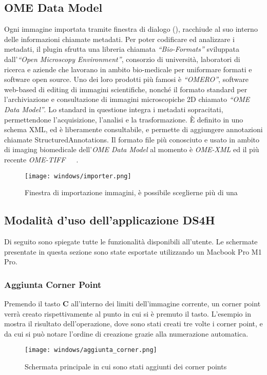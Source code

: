 \subsection{OME Data Model}
\noindent Ogni immagine importata tramite finestra di dialogo (), racchiude al suo interno delle informazioni chiamate metadati. Per poter codificare ed analizzare i metadati, il plugin sfrutta una libreria chiamata \textit{``Bio-Formats''} sviluppata dall'\textit{``Open Microscopy Environment''}, consorzio di università, laboratori di ricerca e aziende che lavorano in ambito bio-medicale per uniformare formati e software open source. Uno dei loro prodotti più famosi è \textit{``OMERO''}, software web-based di editing di immagini scientifiche, nonché il formato standard per l'archiviazione e consultazione di immagini microscopiche 2D chiamato \textit{``OME Data Model''}. Lo standard in questione integra i metadati sopracitati, permettendone l'acquisizione, l'analisi e la trasformazione. È definito in uno schema XML, ed è liberamente consultabile, e permette di aggiungere annotazioni chiamate StructuredAnnotations. Il formato file più conosciuto e usato in ambito di imaging biomedicale dell'\textit{OME Data Model} al momento è \textit{OME-XML} ed il più recente 
\textit{OME-TIFF}~\cite{10.1083/jcb.201004104}~\cite{Allan2012}~\cite{LI201627}.

\begin{figure}[H]
    \centering
    \texttt{[image: windows/importer.png]}
    \caption{Finestra di importazione immagini, è possibile sceglierne più di una}
    \label{fig:9}
\end{figure}


\subsection{Modalità d'uso dell'applicazione DS4H}
\noindent Di seguito sono spiegate tutte le funzionalità disponibili all'utente. Le schermate presentate in questa sezione sono state esportate utilizzando un Macbook Pro M1 Pro.

\subsubsection{Aggiunta Corner Point}
\noindent Premendo il tasto \textbf{C} all'interno dei limiti dell'immagine corrente, un corner point verrà creato rispettivamente al punto in cui si è premuto il tasto.
L'esempio in  mostra il risultato dell'operazione, dove sono stati creati tre volte i corner point, e da cui si può notare l'ordine di creazione grazie alla numerazione automatica.
\begin{figure}[H]
    \centering
    \texttt{[image: windows/aggiunta\_corner.png]}
    \caption{Schermata principale in cui sono stati aggiunti dei corner points}
    \label{fig:10}
\end{figure}

